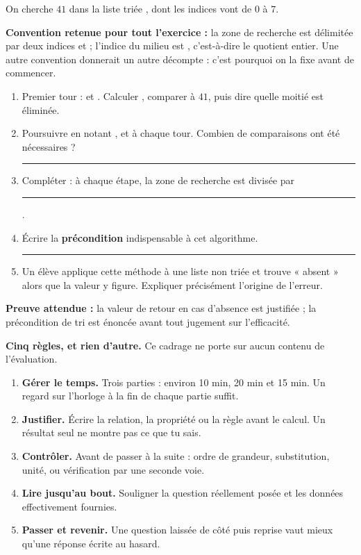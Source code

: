 \documentclass[10pt,a4paper]{article}
\begin{document}
On cherche $41$ dans la liste triée \code{[3, 8, 12, 19, 25, 33, 41, 50]}, dont les indices vont de $0$ à $7$.
\begin{graybox}\small
\textbf{Convention retenue pour tout l'exercice :} la zone de recherche est délimitée par deux indices
 et  ; l'indice du milieu est , c'est-à-dire le quotient entier.
Une autre convention donnerait un autre décompte : c'est pourquoi on la fixe avant de commencer.
\end{graybox}
\begin{enumerate}
\item Premier tour :  et . Calculer , comparer  à $41$, puis dire
quelle moitié est éliminée.
\item Poursuivre en notant ,  et  à chaque tour. Combien de comparaisons ont été
nécessaires ? \rule{22mm}{0.32pt}
\item Compléter : à chaque étape, la zone de recherche est divisée par \rule{15mm}{0.32pt}.
\item Écrire la \textbf{précondition} indispensable à cet algorithme. \rule{75mm}{0.32pt}
\item Un élève applique cette méthode à une liste non triée et trouve « absent » alors que la valeur y figure.
Expliquer précisément l'origine de l'erreur.
\end{enumerate}

\begin{successbox}
\textbf{Preuve attendue :} la valeur de retour en cas d'absence est justifiée ; la précondition de tri est
énoncée avant tout jugement sur l'efficacité.
\end{successbox}

\needspace{62mm}\par\vspace{3mm}

\begin{methodbox}
\textbf{Cinq règles, et rien d'autre.} Ce cadrage ne porte sur aucun contenu de l'évaluation.
\begin{enumerate}
\item \textbf{Gérer le temps.} Trois parties : environ 10 min, 20 min et 15 min. Un regard sur l'horloge à la fin de chaque partie suffit.
\item \textbf{Justifier.} Écrire la relation, la propriété ou la règle avant le calcul. Un résultat seul ne montre pas ce que tu sais.
\item \textbf{Contrôler.} Avant de passer à la suite : ordre de grandeur, substitution, unité, ou vérification par une seconde voie.
\item \textbf{Lire jusqu'au bout.} Souligner la question réellement posée et les données effectivement fournies.
\item \textbf{Passer et revenir.} Une question laissée de côté puis reprise vaut mieux qu'une réponse écrite au hasard.
\end{enumerate}
\end{methodbox}
\end{document}
